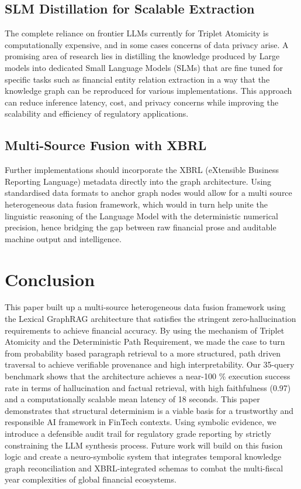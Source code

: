 \documentclass[conference]{IEEEtran}
\begin{document}
\subsection{SLM Distillation for Scalable Extraction}
The complete reliance on frontier LLMs currently for Triplet Atomicity is computationally expensive, and in some cases concerns of data privacy arise. A promising area of research lies in distilling the knowledge produced by Large models into dedicated Small Language Models (SLMs) that are fine tuned for specific tasks such as financial entity relation extraction in a way that the knowledge graph can be reproduced for various implementations. This approach can reduce inference latency, cost, and privacy concerns while improving the scalability and efficiency of regulatory applications.

\subsection{Multi-Source Fusion with XBRL}
Further implementations should incorporate the XBRL (eXtensible Business Reporting Language) metadata directly into the graph architecture. Using standardised data formats to anchor graph nodes would allow for a multi source heterogeneous data fusion framework, which would in turn help unite the linguistic reasoning of the Language Model with the deterministic numerical precision, hence bridging the gap between raw financial prose and auditable machine output and intelligence.

\section{Conclusion}
This paper built up a multi-source heterogeneous data fusion framework using the Lexical GraphRAG architecture that satisfies the stringent zero-hallucination requirements to achieve financial accuracy. By using the mechanism of Triplet Atomicity and the Deterministic Path Requirement, we made the case to turn from probability based paragraph retrieval to a more structured, path driven traversal to achieve verifiable provenance and high interpretability. Our 35-query benchmark shows that the architecture achieves a near-100 \% execution success rate in terms of hallucination and factual retrieval, with high faithfulness (0.97) and a computationally scalable mean latency of 18 seconds. This paper demonstrates that structural determinism is a viable basis for a trustworthy and responsible AI framework in FinTech contexts. Using symbolic evidence, we introduce a defensible audit trail for regulatory grade reporting by strictly constraining the LLM synthesis process. Future work will build on this fusion logic and create a neuro-symbolic system that integrates temporal knowledge graph reconciliation and XBRL-integrated schemas to combat the multi-fiscal year complexities of global financial ecosystems.
\end{document}
